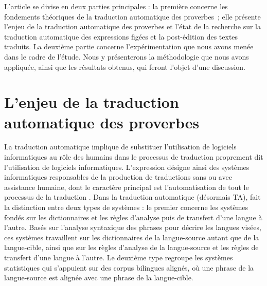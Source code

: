 \documentclass[french]{textolivre}
\begin{document}
L’article se divise en deux parties principales : la première concerne les fondements théoriques de la traduction automatique des proverbes ; elle présente l’enjeu de la traduction automatique des proverbes et l’état de la recherche sur la traduction automatique des expressions figées et la post-édition des textes traduits. La deuxième partie concerne l’expérimentation que nous avons menée dans le cadre de l’étude. Nous y présenterons la méthodologie que nous avons appliquée, ainsi que les résultats obtenus, qui feront l’objet d’une discussion.

\section{L’enjeu de la traduction automatique des proverbes}\label{sec-normas}
La traduction automatique implique de substituer l’utilisation de logiciels informatiques au rôle des humains dans le processus de traduction proprement dit l’utilisation de logiciels informatiques. L’expression désigne ainsi des systèmes informatiques responsables de la production de traductions sans ou avec assistance humaine, dont le caractère principal est l’automatisation de tout le processus de la traduction \cite[p.~431]{hutchins_1995}. Dans la traduction automatique (désormais TA), \textcite[p.~77]{poibeau_traduire_2016} fait la distinction entre deux types de systèmes : le premier concerne les systèmes fondés sur les dictionnaires et les règles d’analyse puis de transfert d’une langue à l’autre. Basés sur l’analyse syntaxique des phrases pour décrire les langues visées, ces systèmes travaillent sur les dictionnaires de la langue-source autant que de la langue-cible, ainsi que sur les règles d’analyse de la langue-source et les règles de transfert d’une langue à l’autre. Le deuxième type regroupe les systèmes statistiques qui s’appuient sur des corpus bilingues alignés, où une phrase de la langue-source est alignée avec une phrase de la langue-cible. 
\end{document}
